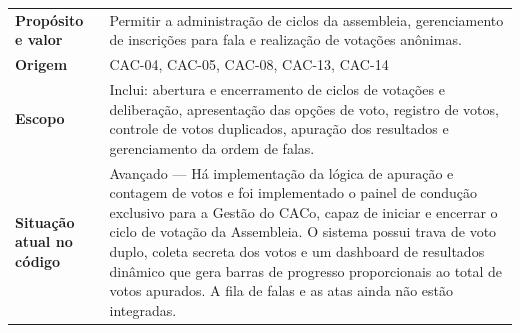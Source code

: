 \documentclass[12pt,a4paper]{article}
\begin{document}
\renewcommand{\arraystretch}{1.5}
\begin{table}[H]
    \centering
    \begin{tabular}{|m{4.5cm} | m{11cm}|}
    \hline
    
    \textbf{Propósito e valor} &
    Permitir a administração de ciclos da assembleia, gerenciamento de inscrições para fala e realização de votações anônimas. \\

    \textbf{Origem} & CAC-04, CAC-05, CAC-08, CAC-13, CAC-14\\
    
    \textbf{Escopo} &
    Inclui: abertura e encerramento de ciclos de votações e deliberação, apresentação das opções de voto, registro de votos, controle de votos duplicados, apuração dos resultados e gerenciamento da ordem de falas. \\
    
    
    \textbf{Situação atual no código} &
    Avançado --- Há implementação da lógica de apuração e contagem de votos e foi implementado o painel de condução exclusivo para a Gestão do CACo, capaz de iniciar e encerrar o ciclo de votação da Assembleia. O sistema possui trava de voto duplo, coleta secreta dos votos e um dashboard de resultados dinâmico que gera barras de progresso proporcionais ao total de votos apurados. A fila de falas e as atas ainda não estão integradas.\\
    \hline
    \end{tabular}
\end{table}

\vspace{0.5cm}
\end{document}
